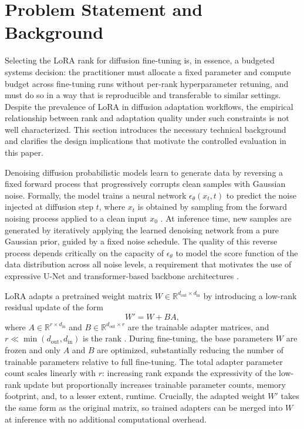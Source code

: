 \documentclass[pdflatex,sn-mathphys-num]{Springer_format/sn-jnl}
\begin{document}
  \section{Problem Statement and Background}
  \label{sec:background}
  
  Selecting the LoRA rank for diffusion fine-tuning is, in essence, a budgeted systems
  decision: the practitioner must allocate a fixed parameter and compute budget across
  fine-tuning runs without per-rank hyperparameter retuning, and must do so in a way that
  is reproducible and transferable to similar settings. Despite the prevalence of LoRA in
  diffusion adaptation workflows, the empirical relationship between rank and adaptation
  quality under such constraints is not well characterized. This section introduces the
  necessary technical background and clarifies the design implications that motivate the
  controlled evaluation in this paper.
  
  Denoising diffusion probabilistic models learn to generate data by reversing a fixed
  forward process that progressively corrupts clean samples with Gaussian noise. Formally,
  the model trains a neural network $\epsilon_\theta(x_t, t)$ to predict the noise injected
  at diffusion step $t$, where $x_t$ is obtained by sampling from the forward noising process
  applied to a clean input $x_0$ \cite{ho2020ddpm}. At inference time, new samples are
  generated by iteratively applying the learned denoising network from a pure Gaussian prior,
  guided by a fixed noise schedule. The quality of this reverse process depends critically on
  the capacity of $\epsilon_\theta$ to model the score function of the data distribution
  across all noise levels, a requirement that motivates the use of expressive U-Net and
  transformer-based backbone architectures \cite{ho2020ddpm, peebles2023dit}.
  
  LoRA adapts a pretrained weight matrix $W \in \mathbb{R}^{d_{\text{out}} \times d_{\text{in}}}$
  by introducing a low-rank residual update of the form
  \begin{equation}
    W' = W + BA,
    \label{eq:lora}
  \end{equation}
  where $A \in \mathbb{R}^{r \times d_{\text{in}}}$ and
  $B \in \mathbb{R}^{d_{\text{out}} \times r}$ are the trainable adapter matrices, and
  $r \ll \min(d_{\text{out}}, d_{\text{in}})$ is the rank \cite{hu2022lora}. During
  fine-tuning, the base parameters $W$ are frozen and only $A$ and $B$ are optimized,
  substantially reducing the number of trainable parameters relative to full fine-tuning.
  The total adapter parameter count scales linearly with $r$: increasing rank expands the
  expressivity of the low-rank update but proportionally increases trainable parameter
  counts, memory footprint, and, to a lesser extent, runtime. Crucially, the adapted weight
  $W'$ takes the same form as the original matrix, so trained adapters can be merged into
  $W$ at inference with no additional computational overhead.
  
\end{document}
